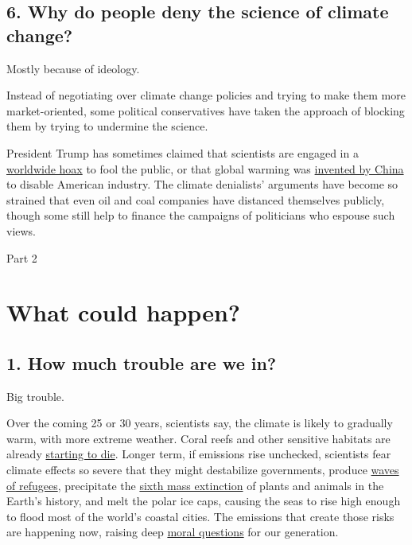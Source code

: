 \hypertarget{6-why-do-people-deny-the-science-of-climate-change}{%
\subsection{6. Why do people deny the science of climate
change?}\label{6-why-do-people-deny-the-science-of-climate-change}}

Mostly because of ideology.

Instead of negotiating over climate change policies and trying to make
them more market-oriented, some political conservatives have taken the
approach of blocking them by trying to undermine the science.

President Trump has sometimes claimed that scientists are engaged in a
\href{https://www.amazon.com/The-Greatest-Hoax-Conspiracy-Threatens/dp/1936488493}{worldwide
hoax} to fool the public, or that global warming was
\href{https://www.nytimes3xbfgragh.onion/2016/11/19/world/asia/china-trump-climate-change.html}{invented
by China} to disable American industry. The climate denialists'
arguments have become so strained that even oil and coal companies have
distanced themselves publicly, though some still help to finance the
campaigns of politicians who espouse such views.

Part 2

\hypertarget{what-could-happen}{%
\section{What could happen?}\label{what-could-happen}}

\hypertarget{1-how-much-trouble-are-we-in}{%
\subsection{1. How much trouble are we
in?}\label{1-how-much-trouble-are-we-in}}

Big trouble.

Over the coming 25 or 30 years, scientists say, the climate is likely to
gradually warm, with more extreme weather. Coral reefs and other
sensitive habitats are already
\href{https://www.nytimes3xbfgragh.onion/2017/03/15/science/great-barrier-reef-coral-climate-change-dieoff.html}{starting
to die}. Longer term, if emissions rise unchecked, scientists fear
climate effects so severe that they might destabilize governments,
produce
\href{https://www.nytimes3xbfgragh.onion/2017/04/19/magazine/how-a-warming-planet-drives-human-migration.html}{waves
of refugees}, precipitate the
\href{https://www.nytimes3xbfgragh.onion/2017/07/11/climate/mass-extinction-animal-species.html}{sixth
mass extinction} of plants and animals in the Earth's history, and melt
the polar ice caps, causing the seas to rise high enough to flood most
of the world's coastal cities. The emissions that create those risks are
happening now, raising deep
\href{https://www.nytimes3xbfgragh.onion/2017/08/10/climate/climate-change-lawsuits-courts.html}{moral
questions} for our generation.

